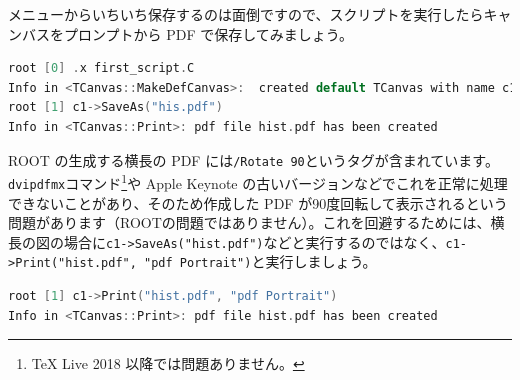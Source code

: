 {メニューからいちいち保存するのは面倒ですので、スクリプトを実行したらキャンバスをプロンプトから PDF で保存してみましょう。

\begin{lstlisting}[language=c++]
root [0] .x first_script.C
Info in <TCanvas::MakeDefCanvas>:  created default TCanvas with name c1
root [1] c1->SaveAs("his.pdf")
Info in <TCanvas::Print>: pdf file hist.pdf has been created
\end{lstlisting}

ROOT の生成する横長の PDF には\texttt{/Rotate 90}というタグが含まれています。\texttt{dvipdfmx}コマンド\footnote{TeX Live 2018 以降では問題ありません。}や Apple Keynote の古いバージョンなどでこれを正常に処理できないことがあり、そのため作成した PDF が90度回転して表示されるという問題があります（ROOTの問題ではありません）。これを回避するためには、横長の図の場合に\texttt{c1->SaveAs("hist.pdf")}などと実行するのではなく、\texttt{c1->Print("hist.pdf", "pdf Portrait")}と実行しましょう。

\begin{lstlisting}[language=c++]
root [1] c1->Print("hist.pdf", "pdf Portrait")
Info in <TCanvas::Print>: pdf file hist.pdf has been created
\end{lstlisting}

}

